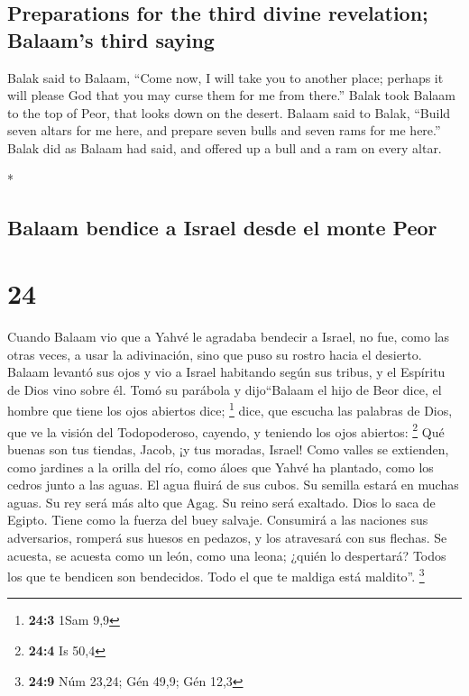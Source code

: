 \begin{paracol}{2}
\begin{otherlanguage}{english}
\hypertarget{preparations-for-the-third-divine-revelation-balaams-third-saying}{%
\subsection{Preparations for the third divine revelation; Balaam's third
saying}\label{preparations-for-the-third-divine-revelation-balaams-third-saying}}

 Balak said to Balaam, ``Come now, I will take you to
another place; perhaps it will please God that you may curse them for me
from there.''  Balak took Balaam to the top of Peor, that
looks down on the desert.  Balaam said to Balak, ``Build
seven altars for me here, and prepare seven bulls and seven rams for me
here.''  Balak did as Balaam had said, and offered up a
bull and a ram on every altar.

\end{otherlanguage}

\switchcolumn[0]*

\hypertarget{balaam-bendice-a-israel-desde-el-monte-peor}{%
\subsection{Balaam bendice a Israel desde el monte
Peor}\label{balaam-bendice-a-israel-desde-el-monte-peor}}

\hypertarget{section-46}{%
\section{24}\label{section-46}}

 Cuando Balaam vio que a Yahvé le agradaba bendecir a
Israel, no fue, como las otras veces, a usar la adivinación, sino que
puso su rostro hacia el desierto.  Balaam levantó sus ojos
y vio a Israel habitando según sus tribus, y el Espíritu de Dios vino
sobre él.  Tomó su parábola y dijo``Balaam el hijo de Beor
dice, el hombre que tiene los ojos abiertos dice; \footnote{\textbf{24:3}
  1Sam 9,9}  dice, que escucha las palabras de Dios, que
ve la visión del Todopoderoso, cayendo, y teniendo los ojos abiertos:
\footnote{\textbf{24:4} Is 50,4}  Qué buenas son tus
tiendas, Jacob, ¡y tus moradas, Israel!  Como valles se
extienden, como jardines a la orilla del río, como áloes que Yahvé ha
plantado, como los cedros junto a las aguas.  El agua
fluirá de sus cubos. Su semilla estará en muchas aguas. Su rey será más
alto que Agag. Su reino será exaltado.  Dios lo saca de
Egipto. Tiene como la fuerza del buey salvaje. Consumirá a las naciones
sus adversarios, romperá sus huesos en pedazos, y los atravesará con sus
flechas.  Se acuesta, se acuesta como un león, como una
leona; ¿quién lo despertará? Todos los que te bendicen son bendecidos.
Todo el que te maldiga está maldito''. \footnote{\textbf{24:9} Núm
  23,24; Gén 49,9; Gén 12,3}


\end{paracol}
